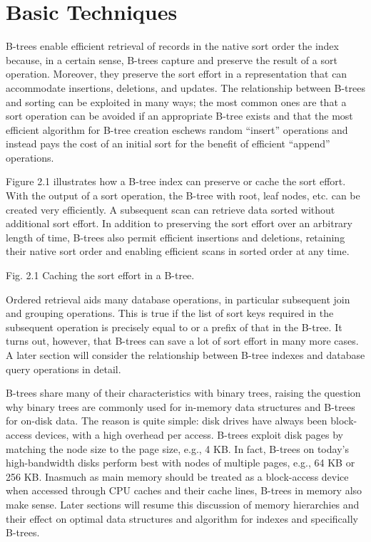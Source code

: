 \hypertarget{basic-techniques}{%
\chapter{Basic Techniques}\label{basic-techniques}}

B-trees enable efficient retrieval of records in the native sort order
the index because, in a certain sense, B-trees capture and preserve the
result of a sort operation. Moreover, they preserve the sort effort in a
representation that can accommodate insertions, deletions, and updates.
The relationship between B-trees and sorting can be exploited in many
ways; the most common ones are that a sort operation can be avoided if
an appropriate B-tree exists and that the most efficient algorithm for
B-tree creation eschews random ``insert'' operations and instead pays
the cost of an initial sort for the benefit of efficient ``append''
operations.

Figure 2.1 illustrates how a B-tree index can preserve or cache the sort
effort. With the output of a sort operation, the B-tree with root, leaf
nodes, etc. can be created very efficiently. A subsequent scan can
retrieve data sorted without additional sort effort. In addition to
preserving the sort effort over an arbitrary length of time, B-trees
also permit efficient insertions and deletions, retaining their native
sort order and enabling efficient scans in sorted order at any time.

Fig. 2.1 Caching the sort effort in a B-tree.

Ordered retrieval aids many database operations, in particular
subsequent join and grouping operations. This is true if the list of
sort keys required in the subsequent operation is precisely equal to or
a prefix of that in the B-tree. It turns out, however, that B-trees can
save a lot of sort effort in many more cases. A later section will
consider the relationship between B-tree indexes and database query
operations in detail.

B-trees share many of their characteristics with binary trees, raising
the question why binary trees are commonly used for in-memory data
structures and B-trees for on-disk data. The reason is quite simple:
disk drives have always been block-access devices, with a high overhead
per access. B-trees exploit disk pages by matching the node size to the
page size, e.g., 4 KB. In fact, B-trees on today's high-bandwidth disks
perform best with nodes of multiple pages, e.g., 64 KB or 256 KB.
Inasmuch as main memory should be treated as a block-access device when
accessed through CPU caches and their cache lines, B-trees in memory
also make sense. Later sections will resume this discussion of memory
hierarchies and their effect on optimal data structures and algorithm
for indexes and specifically B-trees.


